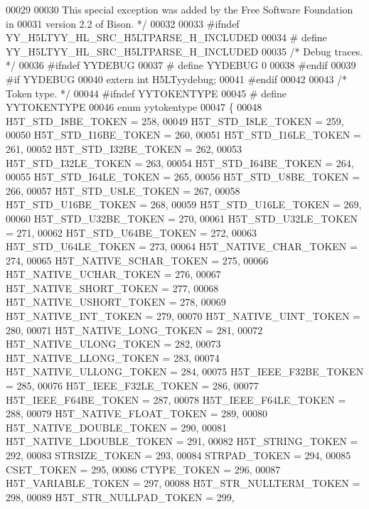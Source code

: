 \begin{DoxyCode}
00029 \textcolor{comment}{}
00030 \textcolor{comment}{   This special exception was added by the Free Software Foundation in}
00031 \textcolor{comment}{   version 2.2 of Bison.  */}
00032 
00033 \textcolor{preprocessor}{#ifndef YY\_H5LTYY\_HL\_SRC\_H5LTPARSE\_H\_INCLUDED}
00034 \textcolor{preprocessor}{# define YY\_H5LTYY\_HL\_SRC\_H5LTPARSE\_H\_INCLUDED}
00035 \textcolor{comment}{/* Debug traces.  */}
00036 \textcolor{preprocessor}{#ifndef YYDEBUG}
00037 \textcolor{preprocessor}{# define YYDEBUG 0}
00038 \textcolor{preprocessor}{#endif}
00039 \textcolor{preprocessor}{#if YYDEBUG}
00040 \textcolor{keyword}{extern} \textcolor{keywordtype}{int} H5LTyydebug;
00041 \textcolor{preprocessor}{#endif}
00042 
00043 \textcolor{comment}{/* Token type.  */}
00044 \textcolor{preprocessor}{#ifndef YYTOKENTYPE}
00045 \textcolor{preprocessor}{# define YYTOKENTYPE}
00046   \textcolor{keyword}{enum} yytokentype
00047   \{
00048     H5T\_STD\_I8BE\_TOKEN = 258,
00049     H5T\_STD\_I8LE\_TOKEN = 259,
00050     H5T\_STD\_I16BE\_TOKEN = 260,
00051     H5T\_STD\_I16LE\_TOKEN = 261,
00052     H5T\_STD\_I32BE\_TOKEN = 262,
00053     H5T\_STD\_I32LE\_TOKEN = 263,
00054     H5T\_STD\_I64BE\_TOKEN = 264,
00055     H5T\_STD\_I64LE\_TOKEN = 265,
00056     H5T\_STD\_U8BE\_TOKEN = 266,
00057     H5T\_STD\_U8LE\_TOKEN = 267,
00058     H5T\_STD\_U16BE\_TOKEN = 268,
00059     H5T\_STD\_U16LE\_TOKEN = 269,
00060     H5T\_STD\_U32BE\_TOKEN = 270,
00061     H5T\_STD\_U32LE\_TOKEN = 271,
00062     H5T\_STD\_U64BE\_TOKEN = 272,
00063     H5T\_STD\_U64LE\_TOKEN = 273,
00064     H5T\_NATIVE\_CHAR\_TOKEN = 274,
00065     H5T\_NATIVE\_SCHAR\_TOKEN = 275,
00066     H5T\_NATIVE\_UCHAR\_TOKEN = 276,
00067     H5T\_NATIVE\_SHORT\_TOKEN = 277,
00068     H5T\_NATIVE\_USHORT\_TOKEN = 278,
00069     H5T\_NATIVE\_INT\_TOKEN = 279,
00070     H5T\_NATIVE\_UINT\_TOKEN = 280,
00071     H5T\_NATIVE\_LONG\_TOKEN = 281,
00072     H5T\_NATIVE\_ULONG\_TOKEN = 282,
00073     H5T\_NATIVE\_LLONG\_TOKEN = 283,
00074     H5T\_NATIVE\_ULLONG\_TOKEN = 284,
00075     H5T\_IEEE\_F32BE\_TOKEN = 285,
00076     H5T\_IEEE\_F32LE\_TOKEN = 286,
00077     H5T\_IEEE\_F64BE\_TOKEN = 287,
00078     H5T\_IEEE\_F64LE\_TOKEN = 288,
00079     H5T\_NATIVE\_FLOAT\_TOKEN = 289,
00080     H5T\_NATIVE\_DOUBLE\_TOKEN = 290,
00081     H5T\_NATIVE\_LDOUBLE\_TOKEN = 291,
00082     H5T\_STRING\_TOKEN = 292,
00083     STRSIZE\_TOKEN = 293,
00084     STRPAD\_TOKEN = 294,
00085     CSET\_TOKEN = 295,
00086     CTYPE\_TOKEN = 296,
00087     H5T\_VARIABLE\_TOKEN = 297,
00088     H5T\_STR\_NULLTERM\_TOKEN = 298,
00089     H5T\_STR\_NULLPAD\_TOKEN = 299,

\end{DoxyCode}
